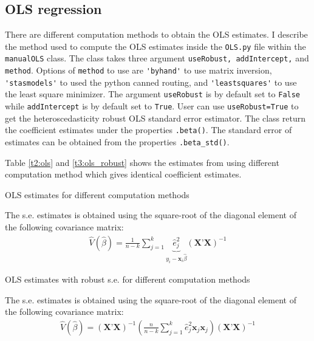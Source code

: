 \documentclass{article}
\begin{document}
\subsection{OLS regression}
There are different computation methods to obtain the OLS estimates. I describe the method used to compute the OLS estimates inside the \verb!OLS.py! file within the \verb!manualOLS! class. The class takes three argument \verb!useRobust, addIntercept,! and \verb!method!. Options of \verb!method! to use are \verb|'byhand'| to use matrix inversion, \verb|'stasmodels'| to used the python canned routing, and \verb|'leastsquares'| to use the least square minimizer. The argument \verb!useRobust! is by default set to \verb!False! while \verb!addIntercept! is by default set to \verb!True!. User can use \verb!useRobust=True! to get the heteroscedasticity robust OLS standard error estimator. The class return the coefficient estimates under the properties \verb!.beta()!. The standard error of estimates can be obtained from the properties \verb!.beta_std()!. 

Table \ref{t2:ols} and \ref{t3:ols_robust} shows the estimates from using different computation method which gives identical coefficient estimates.

\begin{table}[H]\centering
\begin{threeparttable}
    \caption{OLS estimates for different computation methods}
    \label{t2:ols}
    
    \begin{tablenotes}
    \small \item The s.e. estimates is obtained using the square-root of the diagonal element of the following covariance matrix:
    \begin{align*}
        \hat{V}(\hat{\beta})=\frac{1}{n-k}\sum_{j=1}^k \underbrace{\hat{e}_j^2}_{y_i-\textbf{x}_i\hat{\beta}}\left(\textbf{X'}\textbf{X}\right)^{-1}
    \end{align*}
    
    \end{tablenotes}
\end{threeparttable}
\end{table}

\begin{table}[H]\centering
    \begin{threeparttable}
        \caption{OLS estimates with robust s.e. for different computation methods}
        \label{t3:ols_robust}
        
        \begin{tablenotes}
        \small \item The s.e. estimates is obtained using the square-root of the diagonal element of the following covariance matrix:
    \begin{align*}
        \hat{V}(\hat{\beta})=\left(\textbf{X'}\textbf{X}\right)^{-1}\left(\frac{n}{n-k}\sum_{j=1}^k \hat{e}_j^2\textbf{x}_j\textbf{x}_j\right)\left(\textbf{X'}\textbf{X}\right)^{-1}    
        \end{align*}
        \end{tablenotes}
    \end{threeparttable}
    \end{table}
\end{document}
